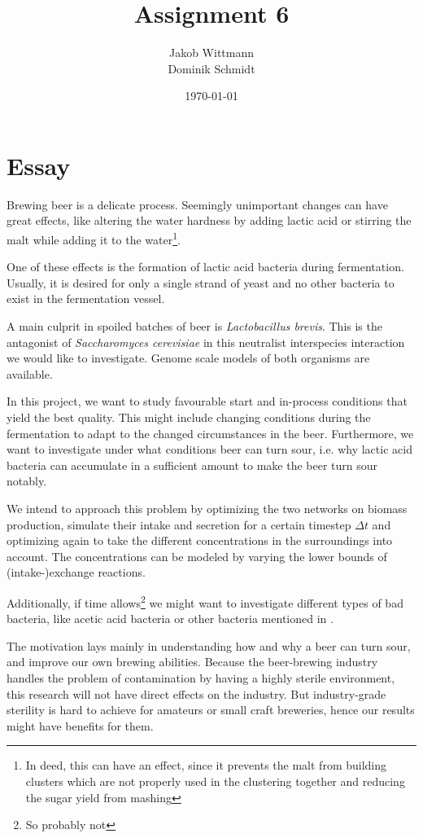\documentclass{scrartcl}
\title{Assignment 6}
\author{Jakob Wittmann\\Dominik Schmidt}
\date{\today}
\begin{document}
\maketitle
\section{Essay}
Brewing beer is a delicate process. Seemingly unimportant changes can have great effects, like altering the water hardness by adding lactic acid or stirring the malt while adding it to the water\footnote{In deed, this can have an effect, since it prevents the malt from building clusters which are not properly used in the clustering together and reducing the sugar yield from mashing}.

One of these effects is the formation of lactic acid bacteria during fermentation.
Usually, it is desired for only a single strand of yeast and no other bacteria to exist in the fermentation vessel.

A main culprit in spoiled batches of beer is \emph{Lactobacillus brevis}\cite{JIB:JIB49}.
This is the antagonist of \emph{Saccharomyces cerevisiae} in this neutralist interspecies interaction we would like to investigate.
Genome scale models of both organisms are available\cite{GEM:KB290}\cite{GEM:S288c}.

In this project, we want to study favourable start and in-process conditions that yield the best quality. This might include changing conditions during the fermentation to adapt to the changed circumstances in the beer.
Furthermore, we want to investigate under what conditions beer can turn sour, i.e. why lactic acid bacteria can accumulate in a sufficient amount to make the beer turn sour notably.

We intend to approach this problem by optimizing the two networks on biomass production, simulate their intake and secretion for a certain timestep $\Delta t$ and optimizing again to take the different concentrations in the surroundings into account.
The concentrations can be modeled by varying the lower bounds of (intake-)exchange reactions.

Additionally, if time allows\footnote{So probably not} we might want to investigate different types of bad bacteria, like acetic acid bacteria or other bacteria mentioned in \cite{JIB:JIB49}.

The motivation lays mainly in understanding how and why a beer can turn sour, and improve our own brewing abilities.
Because the beer-brewing industry handles the problem of contamination by having a highly sterile environment, this research will not have direct effects on the industry.
But industry-grade sterility is hard to achieve for amateurs or small craft breweries, hence our results might have benefits for them.
\end{document}

